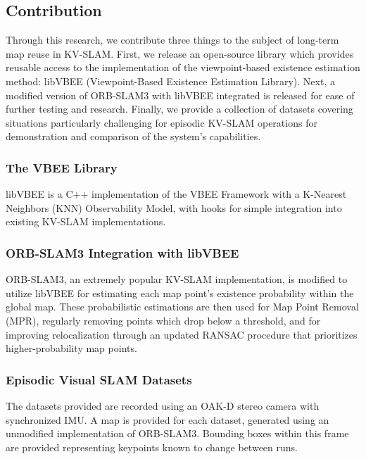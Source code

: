 \subsection{Contribution}

Through this research, we contribute three things to the subject of long-term map reuse in KV-SLAM. First, we release an open-source library which provides reusable access to the implementation of the viewpoint-based existence estimation method: libVBEE (Viewpoint-Based Existence Estimation Library). Next, a modified version of ORB-SLAM3 with libVBEE integrated is released for ease of further testing and research. Finally, we provide a collection of datasets covering situations particularly challenging for episodic KV-SLAM operations for demonstration and comparison of the system's capabilities.

\subsubsection{The VBEE Library}
libVBEE is a C++ implementation of the VBEE Framework with a K-Nearest Neighbors (KNN) Observability Model, with hooks for simple integration into existing KV-SLAM implementations.

\subsubsection{ORB-SLAM3 Integration with libVBEE}
ORB-SLAM3, an extremely popular KV-SLAM implementation, is modified to utilize libVBEE for estimating each map point's existence probability within the global map. These probabilistic estimations are then used for Map Point Removal (MPR), regularly removing points which drop below a threshold, and for improving relocalization through an updated RANSAC procedure that prioritizes higher-probability map points.

\subsubsection{Episodic Visual SLAM Datasets}
The datasets provided are recorded using an OAK-D stereo camera with synchronized IMU. A map is provided for each dataset, generated using an unmodified implementation of ORB-SLAM3. Bounding boxes within this frame are provided representing keypoints known to change between runs.
